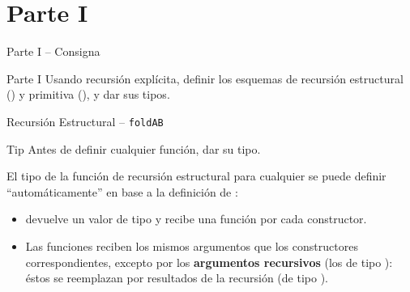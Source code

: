 \section{Parte I}

\begin{frame}{Parte I -- Consigna}
    \begin{exampleblock}{Parte I}
        Usando recursión explícita, definir los esquemas de recursión estructural () y primitiva (), y dar sus tipos.
    \end{exampleblock}    
\end{frame}

\begin{frame}{Recursión Estructural -- \texttt{foldAB}}
    \begin{block}{Tip}
        Antes de definir cualquier función, \alert{dar su tipo}.
    \end{block}

    \pause

    El tipo de la función de recursión estructural  para cualquier  se puede definir ``automáticamente'' en base a la definición de :
    
    \pause

    \begin{itemize}[<+->]
        \item {} devuelve un valor de tipo  y recibe una función  por cada constructor.
        \item Las funciones reciben los mismos argumentos que los constructores correspondientes, excepto por los \textbf{argumentos recursivos} (los de tipo ): éstos se reemplazan por resultados de la recursión (de tipo ).
    \end{itemize}
\end{frame}

